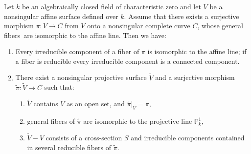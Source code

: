 \subsubsection{}\label{chap1:6.6.3}
\begin{lemma*}
  Let $k$ be an algebraically closed field of characteristic zero and
  let $V$ be a nonsingular affine surface defined over $k$. Assume that
  there exists a surjective morphism $\pi:V\to C$ from $V$ onto a
  nonsingular complete curve $C$, whose general fibers\pageoriginale\ are
  isomorphic to the affine line. Then we have:
  \begin{enumerate}
    \renewcommand{\labelenumi}{\rm(\theenumi)}
  \item Every irreducible component of a fiber of $\pi$ is isomorphic to
    the affine line; if a fiber is reducible every irreducible component
    is a connected component.
    
  \item There exist a nonsingular projective surface $\widetilde{V}$ and
    a surjective morphism $\widetilde{\pi}:\widetilde{V}\to C$ such
    that:
    \begin{enumerate}
      \renewcommand{\theenumii}{\roman{enumii}}
      \renewcommand{\labelenumii}{\rm(\theenumii)}
    \item $\widetilde{V}$ contains $V$ as an open set, and
      $\widetilde{\pi}|_{V}=\pi$, 
      
    \item general fibers of $\widetilde{\pi}$ are isomorphic to the
      projective line $\mathbb{P}^{1}_{k}$,
      
    \item $\widetilde{V}-V$ consists of a cross-section $S$ and
      irreducible components contained in several reducible fibers of
      $\widetilde{\pi}$. 
    \end{enumerate}
  \end{enumerate}
\end{lemma*}

